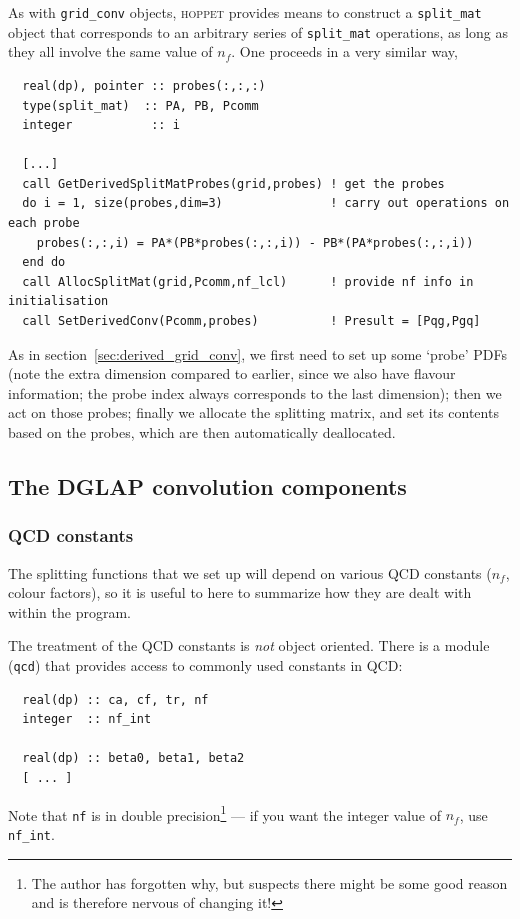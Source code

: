 \documentclass[12pt]{article}
\newcommand{\hoppet}{\textsc{hoppet}\xspace}
\newcommand{\ttt}[1]{\texttt{#1}}
\begin{document}
As with \ttt{grid\_conv} objects, \hoppet provides means to construct
a \ttt{split\_mat} object that corresponds to an arbitrary series of
\ttt{split\_mat} operations, as long as they all involve the same
value of $n_f$. One proceeds in a very similar way,
\begin{verbatim}
  real(dp), pointer :: probes(:,:,:)
  type(split_mat)  :: PA, PB, Pcomm
  integer           :: i

  [...]
  call GetDerivedSplitMatProbes(grid,probes) ! get the probes
  do i = 1, size(probes,dim=3)               ! carry out operations on each probe
    probes(:,:,i) = PA*(PB*probes(:,:,i)) - PB*(PA*probes(:,:,i))
  end do
  call AllocSplitMat(grid,Pcomm,nf_lcl)      ! provide nf info in initialisation
  call SetDerivedConv(Pcomm,probes)          ! Presult = [Pqg,Pgq]
\end{verbatim}
As in section~\ref{sec:derived_grid_conv}, we first need to set up
some `probe' PDFs (note the extra dimension compared to earlier, since
we also have flavour information; the probe index always corresponds
to the last dimension); then we act on those probes; finally we
allocate the splitting matrix, and set its contents based on the
probes, which are then automatically deallocated.



\subsection{The DGLAP convolution components}
\label{sec:dglap_holder}

\subsubsection{QCD constants}
\label{sec:qcd}

The splitting functions that we set up will depend on various QCD
constants ($n_f$, colour factors), so it is useful to here to
summarize how they are dealt with within the program.

The treatment of the QCD constants is \emph{not} object oriented.
There is a module (\ttt{qcd}) that provides access to commonly used
constants in QCD:
\begin{verbatim}
  real(dp) :: ca, cf, tr, nf
  integer  :: nf_int
  
  real(dp) :: beta0, beta1, beta2
  [ ... ]
\end{verbatim}
Note that \ttt{nf} is in double precision\footnote{The author has
  forgotten why, but suspects there might be some good reason and is
  therefore nervous of changing it!} --- if you want the integer value
of $n_f$, use \ttt{nf\_int}. 
\end{document}
